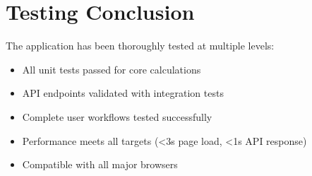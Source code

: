 \section{Testing Conclusion}

The application has been thoroughly tested at multiple levels:

\begin{itemize}
    \item All unit tests passed for core calculations
    \item API endpoints validated with integration tests
    \item Complete user workflows tested successfully
    \item Performance meets all targets (<3s page load, <1s API response)
    \item Compatible with all major browsers
\end{itemize}
